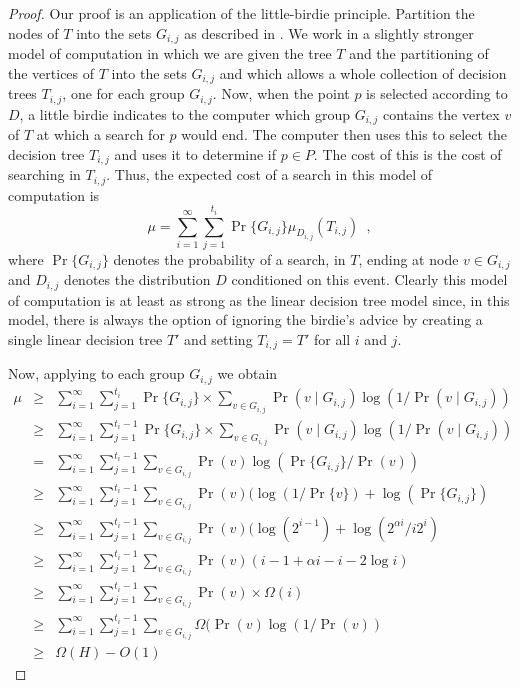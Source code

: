 \documentclass[charterfonts,lotsofwhite]{patmorin}
\begin{document}
\begin{proof}

Our proof is an application of the little-birdie principle.  Partition
the nodes of $T$ into the sets $G_{i,j}$ as described in
.  We work in a slightly stronger model of
computation in which we are given the tree $T$ and the partitioning of
the vertices of $T$ into the sets $G_{i,j}$ and which allows a whole
collection of decision trees $T_{i,j}$, one for each group $G_{i,j}$.
Now, when the point $p$ is selected according to $D$, a little birdie
indicates to the computer which group $G_{i,j}$ contains the vertex
$v$ of $T$ at which a search for $p$ would end.  The computer then
uses this to select the decision tree $T_{i,j}$ and uses it to
determine if $p\in P$.  The cost of this is the cost of searching in
$T_{i,j}$.  Thus, the expected cost of a search in this model of
computation is
\[
     \mu = \sum_{i=1}^\infty \sum_{j=1}^{t_i}
	\Pr\{G_{i,j}\}\mu_{D_{i,j}}(T_{i,j}) \enspace ,
\]
where $\Pr\{G_{i,j}\}$ denotes the probability of a search, in $T$,
ending at node $v\in G_{i,j}$ and $D_{i,j}$ denotes the distribution
$D$ conditioned on this event.  Clearly this model of computation is
at least as strong as the linear decision tree model since, in this
model, there is always the option of ignoring the birdie's advice by
creating a single linear decision tree $T'$ and setting $T_{i,j}=T'$
for all $i$ and $j$.

Now, applying  to each group $G_{i,j}$ we obtain
\begin{eqnarray*}
\mu & \ge & \sum_{i=1}^{\infty}\sum_{j=1}^{t_i}\Pr\{G_{i,j}\}\times
	\sum_{v\in G_{i,j}}\Pr(v\mid G_{i,j})\log(1/\Pr(v\mid G_{i,j})) \\
& \ge & \sum_{i=1}^{\infty}\sum_{j=1}^{t_i-1}\Pr\{G_{i,j}\}\times
	\sum_{v\in G_{i,j}}\Pr(v\mid G_{i,j})\log(1/\Pr(v\mid G_{i,j})) \\
& = & \sum_{i=1}^{\infty}\sum_{j=1}^{t_i-1}
	\sum_{v\in G_{i,j}}\Pr(v)\log(\Pr\{G_{i,j}\}/\Pr(v)) \\
& \ge & \sum_{i=1}^{\infty}\sum_{j=1}^{t_i-1}
	\sum_{v\in G_{i,j}}\Pr(v)(\log(1/\Pr\{v\})+ \log(\Pr\{G_{i,j}\}) \\
& \ge & \sum_{i=1}^{\infty}\sum_{j=1}^{t_i-1}
	\sum_{v\in G_{i,j}}\Pr(v)(\log(2^{i-1}) + \log(2^{\alpha i}/i2^{i}) \\
& \ge & \sum_{i=1}^{\infty}\sum_{j=1}^{t_i-1}
	\sum_{v\in G_{i,j}}\Pr(v)(i-1 + \alpha i -i -2\log i) \\
& \ge & \sum_{i=1}^{\infty}\sum_{j=1}^{t_i-1}
	\sum_{v\in G_{i,j}}\Pr(v)\times \Omega(i) \\
& \ge & \sum_{i=1}^{\infty}\sum_{j=1}^{t_i-1}
	\sum_{v\in G_{i,j}}\Omega(\Pr(v)\log (1/\Pr(v)) \\
& \ge & \Omega(H) -O(1)
\end{eqnarray*}
\end{proof}
\end{document}
